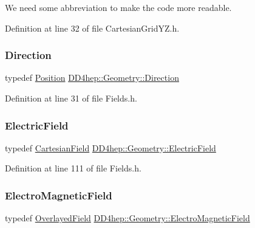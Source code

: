 We need some abbreviation to make the code more readable. 



Definition at line 32 of file Cartesian\+Grid\+Y\+Z.\+h.

\hypertarget{namespace_d_d4hep_1_1_geometry_a56730a0ddb9f3f089c415cd693bd7c19}{}\label{namespace_d_d4hep_1_1_geometry_a56730a0ddb9f3f089c415cd693bd7c19} 
\subsubsection{\texorpdfstring{Direction}{Direction}}
{\footnotesize\ttfamily typedef \hyperlink{namespace_d_d4hep_1_1_geometry_a55083902099d03506c6db01b80404900}{Position} \hyperlink{namespace_d_d4hep_1_1_geometry_a56730a0ddb9f3f089c415cd693bd7c19}{D\+D4hep\+::\+Geometry\+::\+Direction}}



Definition at line 31 of file Fields.\+h.

\hypertarget{namespace_d_d4hep_1_1_geometry_a2562a0506900761fa410a92b8d41e665}{}\label{namespace_d_d4hep_1_1_geometry_a2562a0506900761fa410a92b8d41e665} 
\subsubsection{\texorpdfstring{Electric\+Field}{ElectricField}}
{\footnotesize\ttfamily typedef \hyperlink{class_d_d4hep_1_1_geometry_1_1_cartesian_field}{Cartesian\+Field} \hyperlink{namespace_d_d4hep_1_1_geometry_a2562a0506900761fa410a92b8d41e665}{D\+D4hep\+::\+Geometry\+::\+Electric\+Field}}



Definition at line 111 of file Fields.\+h.

\hypertarget{namespace_d_d4hep_1_1_geometry_a6c49b16dfc8e9487329bfa3b45329f63}{}\label{namespace_d_d4hep_1_1_geometry_a6c49b16dfc8e9487329bfa3b45329f63} 
\subsubsection{\texorpdfstring{Electro\+Magnetic\+Field}{ElectroMagneticField}}
{\footnotesize\ttfamily typedef \hyperlink{class_d_d4hep_1_1_geometry_1_1_overlayed_field}{Overlayed\+Field} \hyperlink{namespace_d_d4hep_1_1_geometry_a6c49b16dfc8e9487329bfa3b45329f63}{D\+D4hep\+::\+Geometry\+::\+Electro\+Magnetic\+Field}}



